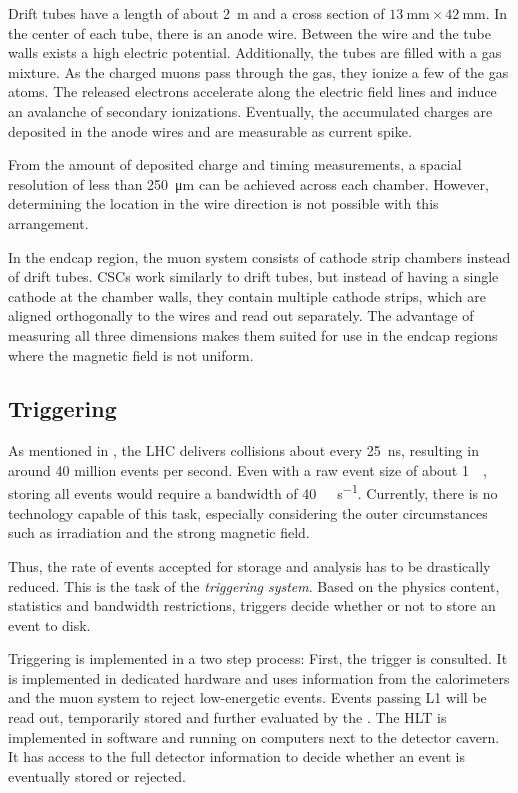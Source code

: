 Drift tubes have a length of about \SI{2}{\meter} and a cross section of $\SI{13}{\milli\meter} \times \SI{42}{\milli\meter}$. In the center of each tube, there is an anode wire. Between the wire and the tube walls exists a high electric potential. Additionally, the tubes are filled with a gas mixture. 
As the charged muons pass through the gas, they ionize a few of the gas atoms. The released electrons accelerate along the electric field lines and induce an avalanche of secondary ionizations. Eventually, the accumulated charges are deposited in the anode wires and are measurable as current spike\cite{ParticleDataGroup:ReviewParticlePhysics}.

From the amount of deposited charge and timing measurements, a spacial resolution of less than \SI{250}{\micro\meter} can be achieved across each chamber. However, determining the location in the wire direction is not possible with this arrangement.

In the endcap region, the muon system consists of cathode strip chambers instead of drift tubes. \acp{CSC} work similarly to drift tubes, but instead of having a single cathode at the chamber walls, they contain multiple cathode strips, which are aligned orthogonally to the wires and read out separately.
The advantage of measuring all three dimensions makes them suited for use in the endcap regions where the magnetic field is not uniform. 


\subsection{Triggering}
\label{sec:triggering}
As mentioned in , the \ac{LHC} delivers collisions about every \SI{25}{\nano\second}, resulting in around \num{40} million events per second. Even with a raw event size of about \SI{1}{\mega\byte}, storing all events would require a bandwidth of \SI{40}{\tera\byte\per\second}. Currently, there is no technology capable of this task, especially considering the outer circumstances such as irradiation and the strong magnetic field.

Thus, the rate of events accepted for storage and analysis has to be drastically reduced. This is the task of the \emph{triggering system}. Based on the physics content, statistics and bandwidth restrictions, triggers decide whether or not to store an event to disk.

Triggering is implemented in a two step process: First, the  trigger is consulted. It is implemented in dedicated hardware and uses information from the calorimeters and the muon system to reject low-energetic events. Events passing \ac{L1} will be read out, temporarily stored and further evaluated by the . The \ac{HLT} is implemented in software and running on computers next to the detector cavern. It has access to the full detector information to decide whether an event is eventually stored or rejected.

